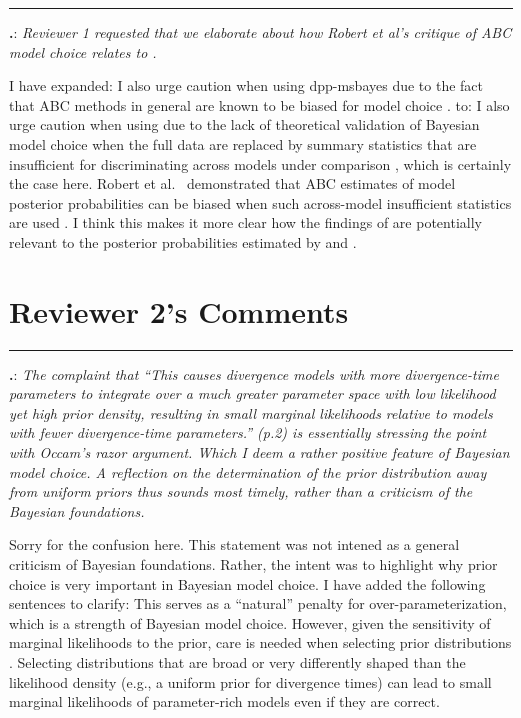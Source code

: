 \documentclass[12pt]{article}
\newcounter{commentCounter}
\newcommand{\revcomment}[1]{{\addtocounter{commentCounter}{1}}
    \medskip \hrule \noindent
\textbf{\arabic{section}.\arabic{commentCounter}}: {\sl #1}\par\xspace}
\newcommand{\response}[1]{{\addtolength{\leftskip}{0.25in} #1\par}\xspace}
\let\quoteOld\quote
\let\endquoteOld\endquote
\renewenvironment{quote}{\sffamily\small\quoteOld}{\endquoteOld}
\begin{document}
\revcomment{
    Reviewer 1 requested that we elaborate about how Robert et al's
    \cite{Robert2011} critique of ABC model choice relates to \dppmsbayes.
}
\response{
    I have expanded:
    \begin{quote}
        I also urge caution when using dpp-msbayes due to the fact that ABC
        methods in general are known to be biased for model choice
        \cite{Robert2011}.
    \end{quote}
    to:
    \begin{quote}
        I also urge caution when using \dppmsbayes due to the lack of
        theoretical validation of Bayesian model choice when the full data are
        replaced by summary statistics that are insufficient for discriminating
        across models under comparison \cite{Robert2011}, which is certainly
        the case here.  Robert et al.\ \cite{Robert2011} demonstrated that ABC
        estimates of model posterior probabilities can be biased when such
        across-model insufficient statistics are used \cite{Robert2011}.
    \end{quote}
    I think this makes it more clear how the findings of \cite{Robert2011} are
    potentially relevant to the posterior probabilities estimated by
    \dppmsbayes and \msb.
}

\section{Reviewer 2's Comments}
\setcounter{commentCounter}{0}

\revcomment{
    The complaint that ``This causes divergence models with more divergence-time
    parameters to integrate over a much greater parameter space with low
    likelihood yet high prior density, resulting in small marginal likelihoods
    relative to models with fewer divergence-time parameters.'' (p.2) is
    essentially stressing the point with Occam's razor argument. Which I deem a
    rather positive feature of Bayesian model choice. A reflection on the
    determination of the prior distribution away from uniform priors thus
    sounds most timely, rather than a criticism of the Bayesian foundations.
}
\response{
    Sorry for the confusion here. This statement was not intened as
    a general criticism of Bayesian foundations. Rather, the intent was to
    highlight why prior choice is very important in Bayesian model choice.
    I have added the following sentences to clarify:
    \begin{quote}
        This serves as a ``natural'' penalty for over-parameterization, which
        is a strength of Bayesian model choice.  However, given the sensitivity
        of marginal likelihoods to the prior, care is needed when selecting
        prior distributions \cite{Lindley1957}.  Selecting distributions that
        are broad or very differently shaped than the likelihood density (e.g.,
        a uniform prior for divergence times) can lead to small marginal
        likelihoods of parameter-rich models even if they are correct.
    \end{quote}
}
\end{document}
